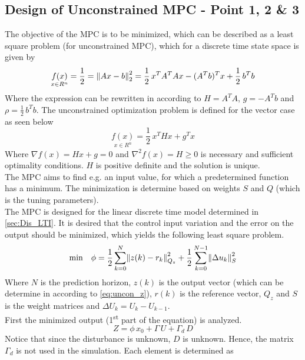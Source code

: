 \subsection{Design of Unconstrained MPC - Point 1, 2 \& 3}
\label{sec:uncon_MPC}
The objective of the MPC is to be minimized, which can be described as a least square problem (for unconstrained MPC), which for a discrete time state space is given by
\begin{equation}
    \underset{x\in R^n}{f(x)}=\frac{1}{2}=\norm{Ax-b}_2^2=\frac{1}{2}\,x^TA^TAx-(A^Tb)^Tx+\frac{1}{2}\,b^Tb
\end{equation}
Where the expression can be rewritten in according to $H=A^TA$, $g=-A^Tb$ and $\rho=\frac{1}{2}\,b^Tb$. The unconstrained optimization problem is defined for the vector case as seen below
\begin{equation}
    \underset{x\in R^n}{f(x)}=\frac{1}{2}\,x^THx+g^Tx
    \label{eq:uncon_f}
\end{equation}
Where $\nabla f(x)=Hx+g=0$ and $\nabla^2f(x)=H\geq 0$ is necessary and sufficient optimality conditions. $H$ is positive definite and the solution is unique.\\
The MPC aims to find e.g. an input value, for which a predetermined function has a minimum. The minimization is determine based on weights $S$ and $Q$ (which is the tuning parameters).\\
The MPC is designed for the linear discrete time model determined in \cref{sec:Dis_LTI}. It is desired that the control input variation and the error on the output should be minimized, which yields the following least square problem.
\begin{equation}
    \text{min}\quad \phi=\frac{1}{2}\, \overset{N}{\underset{k=0}{\sum}}\norm{z(k)-r_k}_{Q_z}^2+\frac{1}{2}\, \overset{N-1}{\underset{k=0}{\sum}}\norm{\Delta u_k}_S^2
    \label{eq:MPC_uncon_lsq}
\end{equation}
Where $N$ is the prediction horizon, $z(k)$ is the output vector (which can be determine in according to \cref{eq:uncon_z}), $r(k)$ is the reference vector, $Q_z$ and $S$ is the weight matrices and $\Delta U_k=U_k-U_{k-1}$.\\
First the minimized output (1\textsuperscript{st} part of the equation) is analyzed.
\begin{equation}
    Z=\phi\,x_0+\Gamma\,U+\Gamma_d\,D
    \label{eq:uncon_z}  
\end{equation}
Notice that since the disturbance is unknown, $D$ is unknown. Hence, the matrix $\Gamma_d$ is not used in the simulation. Each element is determined as
